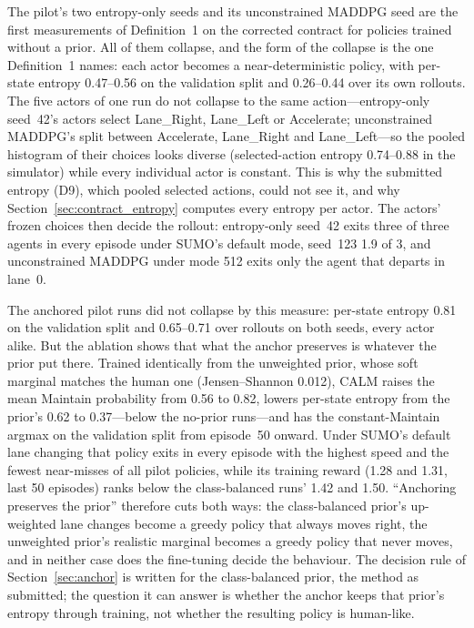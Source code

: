 The pilot's two entropy-only seeds and its unconstrained MADDPG seed are the first measurements of Definition~1 on the corrected contract for policies trained without a prior. All of them collapse, and the form of the collapse is the one Definition~1 names: each actor becomes a near-deterministic policy, with per-state entropy 0.47--0.56 on the validation split and 0.26--0.44 over its own rollouts. The five actors of one run do not collapse to the same action---entropy-only seed~42's actors select Lane\_Right, Lane\_Left or Accelerate; unconstrained MADDPG's split between Accelerate, Lane\_Right and Lane\_Left---so the pooled histogram of their choices looks diverse (selected-action entropy 0.74--0.88 in the simulator) while every individual actor is constant. This is why the submitted entropy (D9), which pooled selected actions, could not see it, and why Section~\ref{sec:contract_entropy} computes every entropy per actor. The actors' frozen choices then decide the rollout: entropy-only seed~42 exits three of three agents in every episode under SUMO's default mode, seed~123 1.9 of 3, and unconstrained MADDPG under mode 512 exits only the agent that departs in lane~0.

The anchored pilot runs did not collapse by this measure: per-state entropy 0.81 on the validation split and 0.65--0.71 over rollouts on both seeds, every actor alike. But the ablation shows that what the anchor preserves is whatever the prior put there. Trained identically from the unweighted prior, whose soft marginal matches the human one (Jensen--Shannon 0.012), CALM raises the mean Maintain probability from 0.56 to 0.82, lowers per-state entropy from the prior's 0.62 to 0.37---below the no-prior runs---and has the constant-Maintain argmax on the validation split from episode~50 onward. Under SUMO's default lane changing that policy exits in every episode with the highest speed and the fewest near-misses of all pilot policies, while its training reward (1.28 and 1.31, last 50 episodes) ranks below the class-balanced runs' 1.42 and 1.50. ``Anchoring preserves the prior'' therefore cuts both ways: the class-balanced prior's up-weighted lane changes become a greedy policy that always moves right, the unweighted prior's realistic marginal becomes a greedy policy that never moves, and in neither case does the fine-tuning decide the behaviour. The decision rule of Section~\ref{sec:anchor} is written for the class-balanced prior, the method as submitted; the question it can answer is whether the anchor keeps that prior's entropy through training, not whether the resulting policy is human-like.

